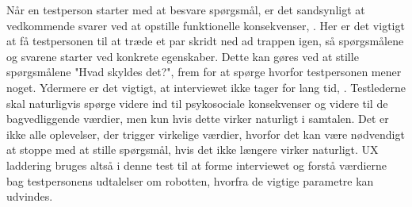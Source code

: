 Når en testperson starter med at besvare spørgsmål, er det sandsynligt at vedkommende svarer ved at opstille funktionelle konsekvenser, \parencite[s. 3]{PDF:LadderingTheUserExperience}. Her er det vigtigt at få testpersonen til at træde et par skridt ned ad trappen igen, så spørgsmålene og svarene starter ved konkrete egenskaber. Dette kan gøres ved at stille spørgsmålene "Hvad skyldes det?", frem for at spørge hvorfor testpersonen mener noget. Ydermere er det vigtigt, at interviewet ikke tager for lang tid, \parencite[s. 4]{PDF:LadderingTheUserExperience}. Testlederne skal naturligvis spørge videre ind til psykosociale konsekvenser og videre til de bagvedliggende værdier, men kun hvis dette virker naturligt i samtalen. Det er ikke alle oplevelser, der trigger virkelige værdier, hvorfor det kan være nødvendigt at stoppe med at stille spørgsmål, hvis det ikke længere virker naturligt. \blankline
%
UX laddering bruges altså i denne test til at forme interviewet og forstå værdierne bag testpersonens udtalelser om robotten, hvorfra de vigtige parametre kan udvindes.

